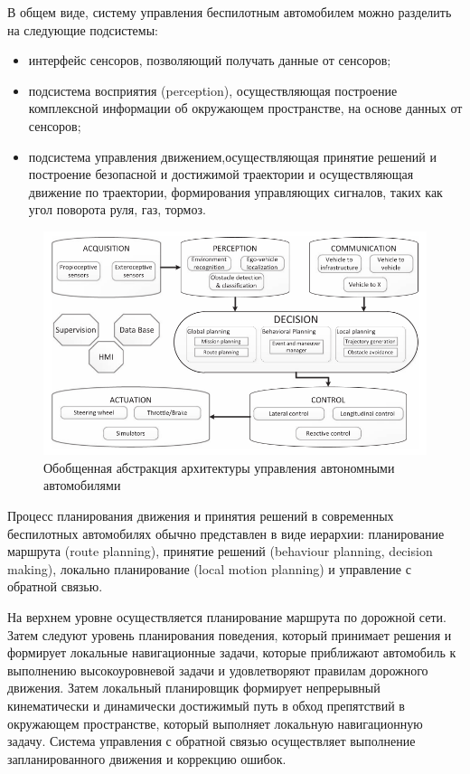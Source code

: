 В общем виде, систему управления беспилотным автомобилем
можно разделить на следующие подсистемы:
\begin{itemize}
    \item интерфейс сенсоров, позволяющий получать данные от сенсоров;
    \item подсистема восприятия (perception), осуществляющая построение комплексной информации об
    окружающем пространстве, на основе данных от сенсоров;
    \item подсистема управления движением,осуществляющая принятие решений и построение безопасной
    и достижимой траектории и осуществляющая движение по траектории, формирования управляющих сигналов,
    таких как угол поворота руля, газ, тормоз. 
\end{itemize}

\begin{figure}[h]
    \centering
    \includegraphics[width=\linewidth]{images/general_arch}
    \caption{Обобщенная абстракция архитектуры управления автономными автомобилями}
    \label{img:general_arch}
\end{figure}

Процесс планирования движения и принятия решений в современных беспилотных автомобилях обычно представлен в виде
иерархии: планирование маршрута (route planning), принятие решений (behaviour planning, decision making), локально планирование
(local motion planning) и управление с обратной связью.

На верхнем уровне осуществляется планирование маршрута по дорожной сети. Затем следуют уровень планирования
поведения, который принимает решения и формирует локальные навигационные задачи, которые приближают автомобиль
к выполнению высокоуровневой задачи и удовлетворяют правилам дорожного движения. Затем локальный планировщик
формирует непрерывный кинематически и динамически достижимый путь в обход препятствий в окружающем пространстве, который выполняет локальную навигационную задачу. Система
управления с обратной связью осуществляет выполнение запланированного движения и коррекцию ошибок. 

